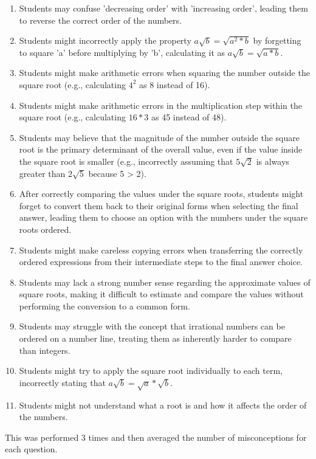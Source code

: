 \documentclass[
    a4paper, %
    10pt, %
    twoside, %
]{LTJournalArticle}
\begin{document}
\begin{enumerate}
    \item Students may confuse 'decreasing order' with 'increasing order', leading them to reverse the correct order of the numbers.
    \item Students might incorrectly apply the property $a\sqrt{b} = \sqrt{a^2 * b}$ by forgetting to square 'a' before multiplying by 'b', calculating it as $a\sqrt{b} = \sqrt{a * b}$.
    \item Students might make arithmetic errors when squaring the number outside the square root (e.g., calculating $4^2$ as 8 instead of 16).
    \item Students might make arithmetic errors in the multiplication step within the square root (e.g., calculating $16 * 3$ as 45 instead of 48).
    \item Students may believe that the magnitude of the number outside the square root is the primary determinant of the overall value, even if the value inside the square root is smaller (e.g., incorrectly assuming that $5\sqrt{2}$ is always greater than $2\sqrt{5}$ because 5 > 2).
    \item After correctly comparing the values under the square roots, students might forget to convert them back to their original forms when selecting the final answer, leading them to choose an option with the numbers under the square roots ordered.
    \item Students might make careless copying errors when transferring the correctly ordered expressions from their intermediate steps to the final answer choice.
    \item Students may lack a strong number sense regarding the approximate values of square roots, making it difficult to estimate and compare the values without performing the conversion to a common form.
    \item Students may struggle with the concept that irrational numbers can be ordered on a number line, treating them as inherently harder to compare than integers.
    \item Students might try to apply the square root individually to each term, incorrectly stating that $a\sqrt{b} = \sqrt{a} * \sqrt{b}$.
    \item Students might not understand what a root is and how it affects the order of the numbers.
\end{enumerate}

This was performed 3 times and then averaged the number of misconceptions for each question.
\end{document}
